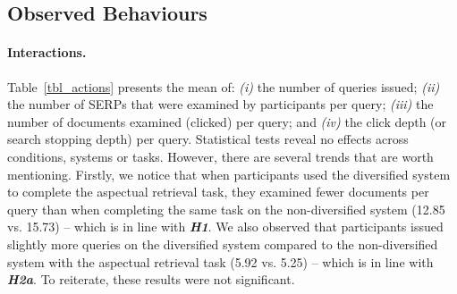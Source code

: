 \subsection{Observed Behaviours}
\paragraph{Interactions.} Table~\ref{tbl_actions} presents the mean of: \textit{(i)} the number of queries issued; \textit{(ii)} the number of SERPs that were examined by participants per query; \textit{(iii)} the number of documents examined (clicked) per query; and \textit{(iv)} the click depth (or search stopping depth) per query. %
Statistical tests reveal no effects across conditions, systems or tasks. However, there are several trends that are worth mentioning. Firstly, we notice that when participants used the diversified system to complete the aspectual retrieval task, they examined fewer documents per query than when completing the same task on the non-diversified system (12.85 vs. 15.73) -- which is in line with \emph{\textbf{H1}}. We also observed that participants issued slightly more queries on the diversified system compared to the non-diversified system with the aspectual retrieval task (5.92 vs. 5.25) -- which is in line with \emph{\textbf{H2a}}. To reiterate, these results were not significant.



